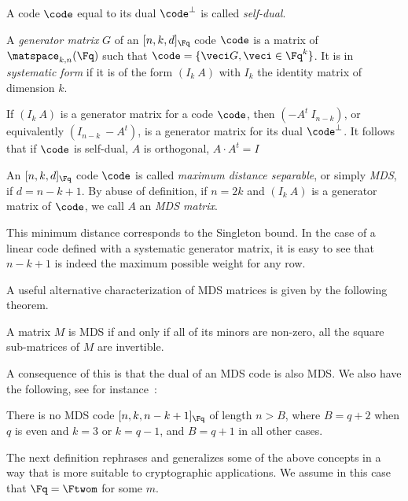 A code $\code$ equal to its dual $\code^\bot$ is called \emph{self-dual}.


\begin{defi}
A \emph{generator matrix} $G$ of an $[n, k, d]_{\Fq}$ code $\code$ is a matrix of $\matspace_{k,n}(\Fq)$ such that
$\code = \{\veci G, \veci \in \Fq^k\}$. It is in \emph{systematic form} if it is of the form $(I_k~A)$ with
$I_k$ the identity matrix of dimension $k$. 
\end{defi}

If $(I_k~A)$ is a generator matrix for a code $\code$, then $(-A^t~I_{n-k})$, or equivalently $(I_{n-k}~-A^t)$,
is a generator matrix for its dual $\code^\bot$. It follows that if $\code$ is self-dual, $A$ is orthogonal,
\ie $A\cdot A^t = I$

\begin{defi}
An $[n,k,d]_{\Fq}$ code $\code$ is called \emph{maximum distance separable}, or simply \emph{MDS}, if $d = n - k + 1$.
By abuse of definition, if $n = 2k$ and $(I_k~A)$ is a generator matrix of $\code$, we call $A$ an \emph{MDS matrix}.
\end{defi}

This minimum distance corresponds to the Singleton bound. In the case of a linear code 
defined with a
systematic generator matrix, it is easy to see that $n - k + 1$ is indeed the maximum possible weight for any row.

A useful alternative characterization of MDS matrices is given by the following theorem.

\begin{thm}
\label{thm:mds_minors}
A matrix $M$ is MDS if and only if all of its minors are non-zero, \ie all the square sub-matrices of $M$ are invertible.
\end{thm}

A consequence of this is that the dual of an MDS code is also MDS.
We also have the following, see for instance~\cite[Chap. 1]{tvn}:

\begin{conj}
There is no MDS code $[n,k,n-k+1]_{\Fq}$ of length $n > B$,
where $B = q + 2$ when $q$ is even and $k = 3$ or $k = q - 1$,
and $B = q + 1$ in all other cases. 
\end{conj}

The next definition rephrases and generalizes some of the above concepts in a way that is more suitable to cryptographic applications.
We assume in this case that $\Fq = \Ftwom$ for some $m$.

